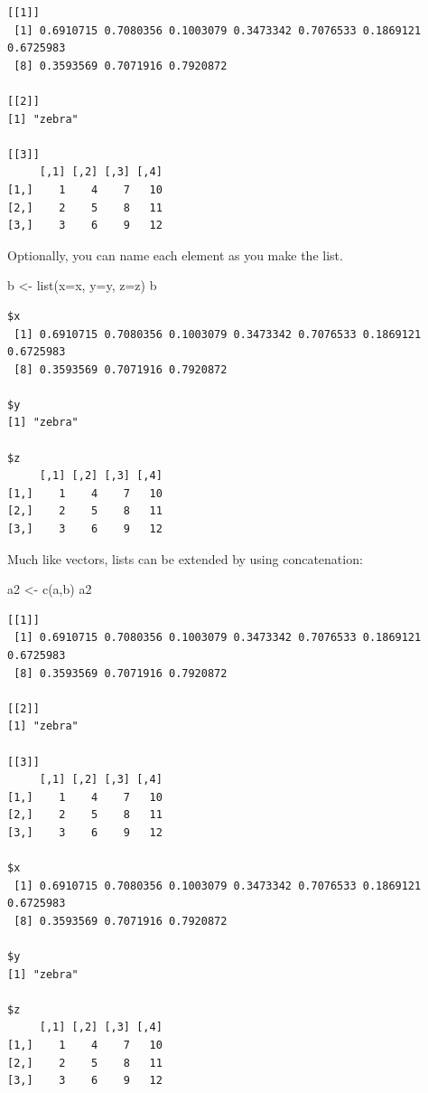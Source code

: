 \documentclass[
  13,
  letterpaper,
]{report}
\newenvironment{Shaded}{\begin{snugshade}}{\end{snugshade}}
\newcommand{\AttributeTok}[1]{\textcolor[rgb]{0.40,0.45,0.13}{#1}}
\newcommand{\FunctionTok}[1]{\textcolor[rgb]{0.28,0.35,0.67}{#1}}
\newcommand{\NormalTok}[1]{\textcolor[rgb]{0.00,0.23,0.31}{#1}}
\newcommand{\OtherTok}[1]{\textcolor[rgb]{0.00,0.23,0.31}{#1}}
\begin{document}
\begin{verbatim}
[[1]]
 [1] 0.6910715 0.7080356 0.1003079 0.3473342 0.7076533 0.1869121 0.6725983
 [8] 0.3593569 0.7071916 0.7920872

[[2]]
[1] "zebra"

[[3]]
     [,1] [,2] [,3] [,4]
[1,]    1    4    7   10
[2,]    2    5    8   11
[3,]    3    6    9   12
\end{verbatim}

Optionally, you can name each element as you make the list.

\begin{Shaded}
\begin{Highlighting}[]
\NormalTok{b }\OtherTok{\textless{}{-}} \FunctionTok{list}\NormalTok{(}\AttributeTok{x=}\NormalTok{x, }\AttributeTok{y=}\NormalTok{y, }\AttributeTok{z=}\NormalTok{z)}
\NormalTok{b}
\end{Highlighting}
\end{Shaded}

\begin{verbatim}
$x
 [1] 0.6910715 0.7080356 0.1003079 0.3473342 0.7076533 0.1869121 0.6725983
 [8] 0.3593569 0.7071916 0.7920872

$y
[1] "zebra"

$z
     [,1] [,2] [,3] [,4]
[1,]    1    4    7   10
[2,]    2    5    8   11
[3,]    3    6    9   12
\end{verbatim}

Much like vectors, lists can be extended by using concatenation:

\begin{Shaded}
\begin{Highlighting}[]
\NormalTok{a2 }\OtherTok{\textless{}{-}} \FunctionTok{c}\NormalTok{(a,b)}
\NormalTok{a2}
\end{Highlighting}
\end{Shaded}

\begin{verbatim}
[[1]]
 [1] 0.6910715 0.7080356 0.1003079 0.3473342 0.7076533 0.1869121 0.6725983
 [8] 0.3593569 0.7071916 0.7920872

[[2]]
[1] "zebra"

[[3]]
     [,1] [,2] [,3] [,4]
[1,]    1    4    7   10
[2,]    2    5    8   11
[3,]    3    6    9   12

$x
 [1] 0.6910715 0.7080356 0.1003079 0.3473342 0.7076533 0.1869121 0.6725983
 [8] 0.3593569 0.7071916 0.7920872

$y
[1] "zebra"

$z
     [,1] [,2] [,3] [,4]
[1,]    1    4    7   10
[2,]    2    5    8   11
[3,]    3    6    9   12
\end{verbatim}
\end{document}

